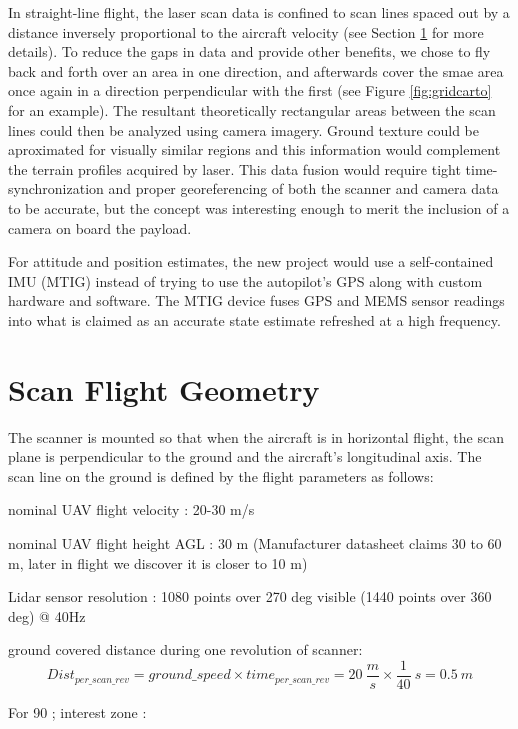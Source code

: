 \documentclass[a4paper,11pt]{report}
\begin{document}
In straight-line flight, the laser scan data is confined to scan lines spaced out by a distance inversely proportional to the aircraft velocity (see Section \ref{geometry} for more details). To reduce the gaps in data and provide other benefits, we chose to fly back and forth over an area in one direction, and afterwards cover the smae area once again in a direction perpendicular with the first (see Figure \ref{fig:gridcarto} for an example). The resultant theoretically rectangular areas between the scan lines could then be analyzed using camera imagery. Ground texture could be aproximated for visually similar regions and this information would complement the terrain profiles acquired by laser. This data fusion would require tight time-synchronization and proper georeferencing of both the scanner and camera data to be accurate, but the concept was interesting enough to merit the inclusion of a camera on board the payload.

For attitude and position estimates, the new project would use a self-contained IMU (MTIG) instead of trying to use the autopilot's GPS along with custom hardware and software. The MTIG device fuses GPS and MEMS sensor readings into what is claimed as an accurate state estimate refreshed at a high frequency.

\section{Scan Flight Geometry}
\label{geometry}

The scanner is mounted so that when the aircraft is in horizontal flight, the scan plane is perpendicular to the ground and the aircraft's longitudinal axis. The scan line on the ground is defined by the flight parameters as follows:

nominal UAV flight velocity : 20-30 m/s

nominal UAV flight height AGL : 30 m (Manufacturer datasheet claims 30 to 60 m, later in flight we discover it is closer to 10 m)

Lidar sensor resolution : 1080 points over 270 deg visible (1440 points over 360 deg) @ 40Hz

ground covered distance during one revolution of scanner:
\begin{equation}
Dist_{per\_scan\_rev} = ground\_speed \times time_{per\_scan\_rev} = 20~\frac{m}{s} \times \frac{1}{40}~s = 0.5~m 
\end{equation}

For 90 \degree; interest zone :
\end{document}
